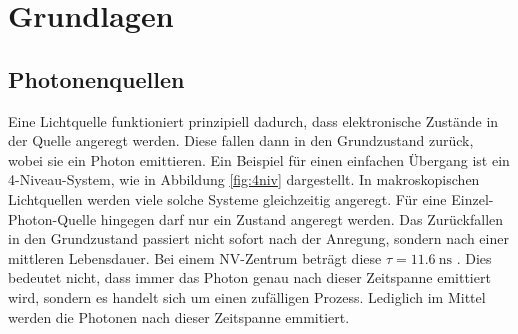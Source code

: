 \section{Grundlagen}
\subsection{Photonenquellen}\label{sec:Photonenquellen}
Eine Lichtquelle funktioniert prinzipiell dadurch, dass elektronische Zust\"ande in der Quelle angeregt werden.
Diese fallen dann in den Grundzustand zur\"uck, wobei sie ein Photon emittieren.
Ein Beispiel f\"ur einen einfachen \"Ubergang ist ein 4-Niveau-System, wie in Abbildung \vref{fig:4niv} dargestellt.
In makroskopischen Lichtquellen werden viele solche Systeme gleichzeitig angeregt.
F\"ur eine Einzel-Photon-Quelle hingegen darf nur ein Zustand angeregt werden. 
Das Zurückfallen in den Grundzustand passiert nicht sofort nach der Anregung, sondern nach einer mittleren Lebensdauer. Bei einem NV-Zentrum beträgt diese $\tau = 11.6\ \mathrm{ns}$ \cite{brouri}. Dies bedeutet nicht, dass immer das Photon genau nach dieser Zeitspanne emittiert wird, sondern es handelt sich um einen zufälligen Prozess. Lediglich im Mittel werden die Photonen nach dieser Zeitspanne emmitiert. 


